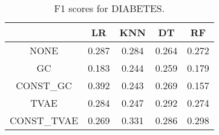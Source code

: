 \begin{table}
\caption{F1 scores for DIABETES.}
\label{tab:f1-DIABETES}
\begin{tabular}{ccccc}
\toprule
 & LR & KNN & DT & RF \\
\midrule
NONE & 0.287 & 0.284 & 0.264 & 0.272 \\
GC & 0.183 & 0.244 & 0.259 & 0.179 \\
CONST\_GC & 0.392 & 0.243 & 0.269 & 0.157 \\
TVAE & 0.284 & 0.247 & 0.292 & 0.274 \\
CONST\_TVAE & 0.269 & 0.331 & 0.286 & 0.298 \\
\bottomrule
\end{tabular}
\end{table}
